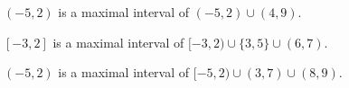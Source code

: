 \documentclass{ximera}
\author{Lee Wayand}
\begin{document}
\begin{exercise}







\begin{question}
$(-5, 2)$ is a maximal interval of $(-5, 2) \cup (4, 9)$.
  \begin{multipleChoice}
  \end{multipleChoice}
\end{question}








\begin{question}
$[-3, 2]$ is a maximal interval of $[-3, 2) \cup \{ 3, 5 \} \cup (6, 7)$.
  \begin{multipleChoice}
  \end{multipleChoice}
\end{question}









\begin{question}
$(-5, 2)$ is a maximal interval of $[-5, 2)  \cup (3, 7) \cup (8, 9)$.
  \begin{multipleChoice}
  \end{multipleChoice}
\end{question}




























\end{exercise}
\end{document}
